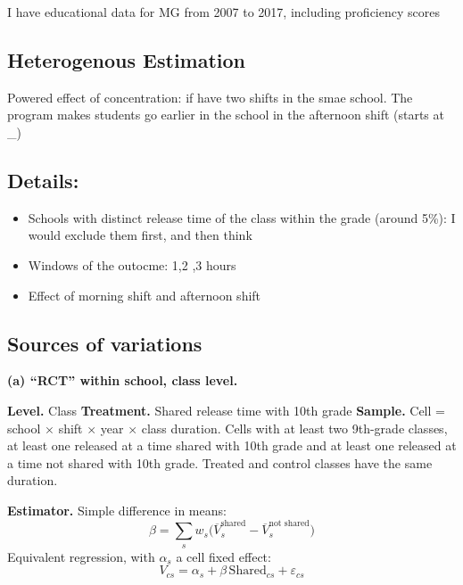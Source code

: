 I have educational data for MG from 2007 to 2017, including proficiency scores


\subsection{Heterogenous Estimation}

Powered effect of concentration: if have two shifts in the smae school. The program makes students go earlier in the school in the afternoon shift (starts at \_)

\subsection{Details:}

\begin{itemize}
      \item Schools with distinct release time of the class within the grade (around 5\%): I would exclude them first, and then think
      \item Windows of the outocme: 1,2 ,3  hours
      \item Effect of morning shift and afternoon shift
\end{itemize}

\subsection{Sources of variations}

\medskip
\noindent\textbf{(a) ``RCT'' within school, class level.}

\noindent\textbf{Level.} Class
 \noindent\textbf{Treatment.} Shared release time with 10th grade
\noindent\textbf{Sample.} Cell = school $\times$ shift $\times$ year
$\times$ class duration. Cells with at least two 9th-grade classes, at
least one released at a time shared with 10th grade and at least one
released at a time not shared with 10th grade. Treated and control
classes have the same duration.

\noindent\textbf{Estimator.} Simple difference in means: 
\begin{equation}
  \hat\beta = \sum_{s} w_s \Big(\overline{V}^{\text{shared}}_{s}
  - \overline{V}^{\text{not shared}}_{s}\Big)
\end{equation}
Equivalent
regression, with $\alpha_s$ a cell fixed effect:
\begin{equation}
  V_{cs} = \alpha_s + \beta\, \text{Shared}_{cs} + \varepsilon_{cs}
\end{equation}

